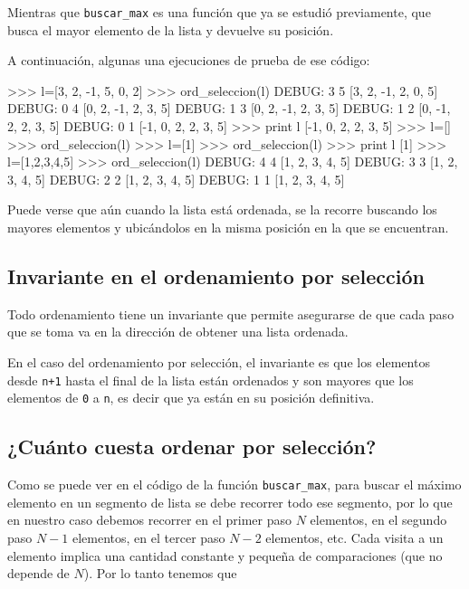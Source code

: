 Mientras que \lstinline!buscar_max! es una función que ya se estudió
previamente, que busca el mayor elemento de la lista y devuelve su
posición.

A continuación, algunas una ejecuciones de prueba de ese código:

\begin{codigo-python-sn}
>>> l=[3, 2, -1, 5, 0, 2]
>>> ord_seleccion(l)
DEBUG:  3 5 [3, 2, -1, 2, 0, 5]
DEBUG:  0 4 [0, 2, -1, 2, 3, 5]
DEBUG:  1 3 [0, 2, -1, 2, 3, 5]
DEBUG:  1 2 [0, -1, 2, 2, 3, 5]
DEBUG:  0 1 [-1, 0, 2, 2, 3, 5]
>>> print l
[-1, 0, 2, 2, 3, 5]
>>> l=[]
>>> ord_seleccion(l)
>>> l=[1]
>>> ord_seleccion(l)
>>> print l
[1]
>>> l=[1,2,3,4,5]
>>> ord_seleccion(l)
DEBUG:  4 4 [1, 2, 3, 4, 5]
DEBUG:  3 3 [1, 2, 3, 4, 5]
DEBUG:  2 2 [1, 2, 3, 4, 5]
DEBUG:  1 1 [1, 2, 3, 4, 5]
\end{codigo-python-sn}

Puede verse que aún cuando la lista está ordenada, se la recorre buscando
los mayores elementos y ubicándolos en la misma posición en la que se
encuentran.

\subsection{Invariante en el ordenamiento por selección}

Todo ordenamiento tiene un invariante que permite asegurarse de que cada
paso que se toma va en la dirección de obtener una lista ordenada.

En el caso del ordenamiento por selección, el invariante es que los
elementos desde \lstinline!n+1! hasta el final de la lista están ordenados y
son mayores que los elementos de \lstinline!0! a \lstinline!n!, es decir
que ya están en su posición definitiva.

\subsection{¿Cuánto cuesta ordenar por selección?}

Como se puede ver en el código de la función \lstinline!buscar_max!, para
buscar el máximo elemento en un segmento de lista se debe recorrer todo ese
segmento, por lo que en nuestro caso debemos recorrer en el primer paso $N$
elementos, en el segundo paso $N-1$ elementos, en el tercer paso $N-2$
elementos, etc. Cada visita a un elemento implica una cantidad constante y
pequeña de comparaciones (que no depende de $N$). Por lo tanto tenemos que

